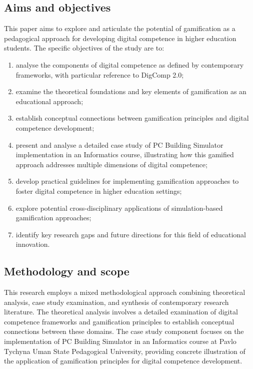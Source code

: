 \documentclass[cte]{acnsart}
\begin{document}
\subsection{Aims and objectives}

This paper aims to explore and articulate the potential of gamification as a pedagogical approach for developing digital competence in higher education students. The specific objectives of the study are to:

\begin{enumerate}[1)]
\item analyse the components of digital competence as defined by contemporary frameworks, with particular reference to DigComp 2.0;
\item examine the theoretical foundations and key elements of gamification as an educational approach;
\item establish conceptual connections between gamification principles and digital competence development;
\item present and analyse a detailed case study of PC Building Simulator implementation in an Informatics course, illustrating how this gamified approach addresses multiple dimensions of digital competence;
\item develop practical guidelines for implementing gamification approaches to foster digital competence in higher education settings;
\item explore potential cross-disciplinary applications of simulation-based gamification approaches; %
\item identify key research gaps and future directions for this field of educational innovation.
\end{enumerate}

\subsection{Methodology and scope}

This research employs a mixed methodological approach combining theoretical analysis, case study examination, and synthesis of contemporary research literature. The theoretical analysis involves a detailed examination of digital competence frameworks and gamification principles to establish conceptual connections between these domains. The case study component focuses on the implementation of PC Building Simulator in an Informatics course at Pavlo Tychyna Uman State Pedagogical University, providing concrete illustration of the application of gamification principles for digital competence development.
\end{document}
